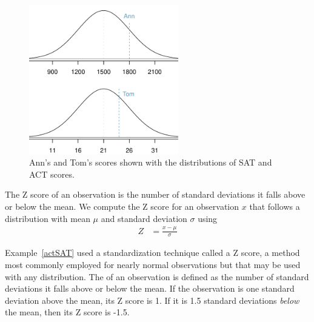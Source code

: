 \begin{figure}[H]
\centering
\includegraphics[width=65mm]{03/figures/satActNormals/satActNormals}
\caption{Ann's and Tom's scores shown with the distributions of SAT and ACT scores.}
\label{satActNormals}
\end{figure}


\begin{termBox}{
The Z score of an observation is the number of standard deviations it falls above or below the mean. We compute the Z score for an observation $x$ that follows a distribution with mean $\mu$ and standard deviation $\sigma$ using
\begin{eqnarray}
Z & = \displaystyle\frac{x-\mu}{\sigma}		\label{zscoreForAnObservation}
\end{eqnarray}}
\end{termBox}

Example~\ref{actSAT} used a standardization technique called a Z score, a method most commonly employed for nearly normal observations but that may be used with any distribution. The  of an observation is defined as the number of standard deviations it falls above or below the mean. If the observation is one standard deviation above the mean, its Z score is 1. If it is 1.5 standard deviations \emph{below} the mean, then its Z score is -1.5. 

